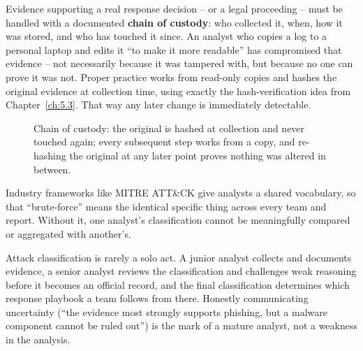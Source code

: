 Evidence supporting a real response decision -- or a legal proceeding -- must be handled with a
documented \textbf{chain of custody}: who collected it, when, how it was stored, and who has touched
it since. An analyst who copies a log to a personal laptop and edits it ``to make it more readable''
has compromised that evidence -- not necessarily because it was tampered with, but because no one
can prove it was not. Proper practice works from read-only copies and hashes the original evidence
at collection time, using exactly the hash-verification idea from Chapter~\ref{ch:5.3}. That way any
later change is immediately detectable.

\begin{figure}[h]
\centering
{}
\caption{Chain of custody: the original is hashed at collection and never touched again; every
subsequent step works from a copy, and re-hashing the original at any later point proves nothing
was altered in between.}
\label{fig:5.6-chain-of-custody}
\end{figure}

Industry frameworks like MITRE ATT\&CK give analysts a shared vocabulary, so that ``brute-force''
means the identical specific thing across every team and report. Without it, one
analyst's classification cannot be meaningfully compared or aggregated with another's.

Attack classification is rarely a solo act. A junior analyst collects and documents evidence, a
senior analyst reviews the classification and challenges weak reasoning before it becomes an
official record, and the final classification determines which response playbook a team follows
from there. Honestly communicating uncertainty (``the evidence most strongly supports phishing, but
a malware component cannot be ruled out'') is the mark of a mature analyst, not a weakness in the
analysis.

